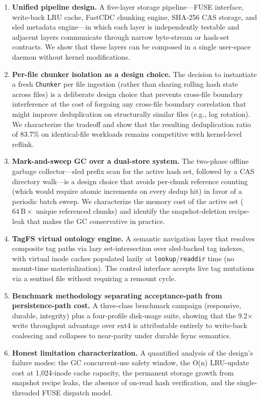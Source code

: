 \documentclass[journal]{IEEEtran}
\begin{document}
\begin{enumerate}
\item \textbf{Unified pipeline design.} A five-layer storage pipeline---FUSE
  interface, write-back LRU cache, FastCDC chunking engine, SHA-256 CAS
  storage, and sled metadata engine---in which each layer is independently
  testable and adjacent layers communicate through narrow byte-stream or
  hash-set contracts.  We show that these layers can be composed in a
  single user-space daemon without kernel modifications.

\item \textbf{Per-file chunker isolation as a design choice.} The
  decision to instantiate a fresh \texttt{Chunker} per file ingestion
  (rather than sharing rolling hash state across files) is a deliberate
  design choice that prevents cross-file boundary interference at the cost
  of forgoing any cross-file boundary correlation that might improve
  deduplication on structurally similar files (e.g., log rotation).
  We characterize the tradeoff and show that the resulting deduplication
  ratio of 83.7\% on identical-file workloads remains competitive with
  kernel-level reflink.

\item \textbf{Mark-and-sweep GC over a dual-store system.} The two-phase
  offline garbage collector---sled prefix scan for the active hash set,
  followed by a CAS directory walk---is a design choice that avoids
  per-chunk reference counting (which would require atomic increments on
  every dedup hit) in favor of a periodic batch sweep.  We characterize
  the memory cost of the active set ($64\,\mathrm{B} \times$ unique
  referenced chunks) and identify the snapshot-deletion recipe-leak that
  makes the GC conservative in practice.

\item \textbf{TagFS virtual ontology engine.} A semantic navigation layer
  that resolves composite tag paths via lazy set-intersection over
  sled-backed tag indexes, with virtual inode caches populated lazily at
  \texttt{lookup}/\texttt{readdir} time (no mount-time materialization).
  The control interface accepts live tag mutations via a sentinel file
  without requiring a remount cycle.

\item \textbf{Benchmark methodology separating acceptance-path from
  persistence-path cost.} A three-class benchmark campaign (responsive,
  durable, integrity) plus a four-profile disk-usage suite, showing that
  the 9.2$\times$ write throughput advantage over ext4 is attributable
  entirely to write-back coalescing and collapses to near-parity under
  durable fsync semantics.

\item \textbf{Honest limitation characterization.} A quantified analysis
  of the design's failure modes: the GC concurrent-use safety window,
  the O(n) LRU-update cost at 1,024-inode cache capacity, the
  permanent storage growth from snapshot recipe leaks, the absence of
  on-read hash verification, and the single-threaded FUSE dispatch model.
\end{enumerate}
\end{document}
